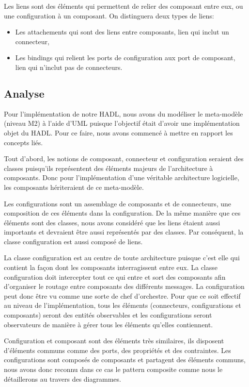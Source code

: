\documentclass[11pt,a4paper]{article}
\begin{document}
Les liens sont des éléments qui permettent de relier des composant entre eux, ou
une configuration à un composant. On distinguera deux types de liens:
\begin{itemize}
  \item Les attachements qui sont des liens entre composants, lien qui inclut un
connecteur,
  \item Les bindings qui relient les ports de configuration aux port de
  composant, lien qui n'inclut pas de connecteurs.
\end{itemize}
 
\clearpage
\subsection{Analyse}

Pour l'implémentation de notre HADL, nous avons du modéliser le meta-modèle
(niveau M2) à l'aide d'UML puisque l'objectif était d'avoir une implémentation
objet du HADL. Pour ce faire, nous avons commencé à mettre en rapport les
concepts liés.

Tout d'abord, les notions de composant, connecteur et configuration seraient des
classes puisqu'ils représentent des éléments majeurs de l'architecture à
composants. Donc pour l'implémentation d'une véritable architecture logicielle,
les composants hériteraient de ce meta-modèle.

Les configurations sont un assemblage de composants et de connecteurs, une
composition de ces éléments dans la configuration. De la même manière que ces
éléments sont des classes, nous avons considéré que les liens étaient aussi
importants et devraient être aussi représentés par des classes. Par conséquent,
la classe configuration est aussi composé de liens.

La classe configuration est au centre de toute architecture puisque c'est elle
qui contient la façon dont les composants interragissent entre eux. La classe
configuration doit intercepter tout ce qui entre et sort des composants afin
d'organiser le routage entre composants des différents messages. La
configuration peut donc être vu comme une sorte de chef d'orchestre. Pour
que ce soit effectif au niveau de l'implémentation, tous les éléments
(connecteurs, configurations et composants) seront des entités observables et
les configurations seront observateurs de manière à gérer tous les éléments
qu'elles contiennent.

Configuration et composant sont des éléments très similaires, ils disposent
d'éléments communs comme des ports, des propriétés et des contraintes. Les
configurations sont composés de composants et partagent des éléments communs,
nous avons donc reconnu dans ce cas le pattern composite comme nous le
détaillerons au travers des diagrammes.
\end{document}
